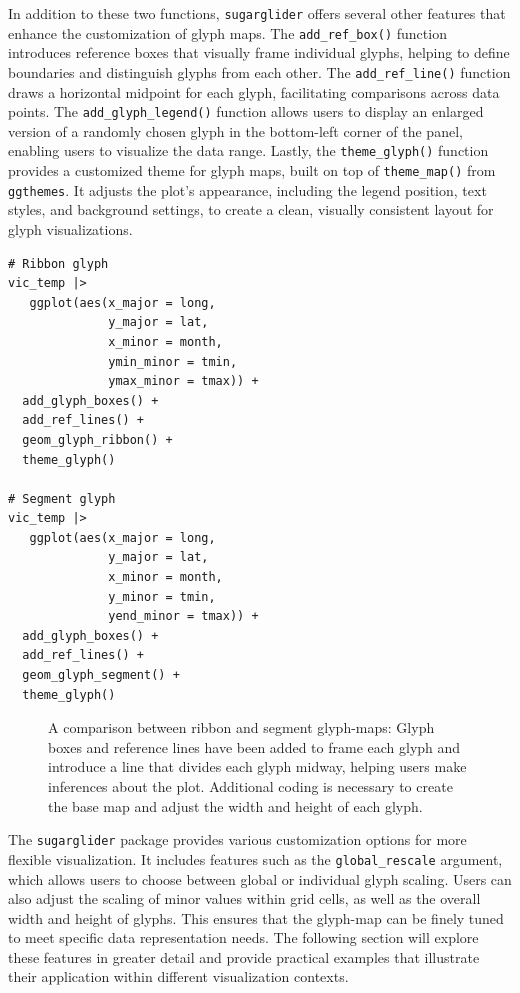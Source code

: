 In addition to these two functions, \texttt{sugarglider} offers several other features that enhance the customization of glyph maps. The \texttt{add\_ref\_box()} function introduces reference boxes that visually frame individual glyphs, helping to define boundaries and distinguish glyphs from each other. The \texttt{add\_ref\_line()} function draws a horizontal midpoint for each glyph, facilitating comparisons across data points. The \texttt{add\_glyph\_legend()} function allows users to display an enlarged version of a randomly chosen glyph in the bottom-left corner of the panel, enabling users to visualize the data range. Lastly, the \texttt{theme\_glyph()} function provides a customized theme for glyph maps, built on top of \texttt{theme\_map()} from \texttt{ggthemes}. It adjusts the plot's appearance, including the legend position, text styles, and background settings, to create a clean, visually consistent layout for glyph visualizations.

\begin{verbatim}
# Ribbon glyph
vic_temp |>
   ggplot(aes(x_major = long,
              y_major = lat,
              x_minor = month,
              ymin_minor = tmin,
              ymax_minor = tmax)) +
  add_glyph_boxes() +
  add_ref_lines() +
  geom_glyph_ribbon() +
  theme_glyph()

# Segment glyph
vic_temp |>
   ggplot(aes(x_major = long,
              y_major = lat,
              x_minor = month,
              y_minor = tmin,
              yend_minor = tmax)) +
  add_glyph_boxes() +
  add_ref_lines() +
  geom_glyph_segment() +
  theme_glyph()
\end{verbatim}

\begin{figure}
\centering
{}
\caption{\label{fig:comparisonPlot}A comparison between ribbon and segment glyph-maps: Glyph boxes and reference lines have been added to frame each glyph and introduce a line that divides each glyph midway, helping users make inferences about the plot. Additional coding is necessary to create the base map and adjust the width and height of each glyph.}
\end{figure}

The \texttt{sugarglider} package provides various customization options for more flexible visualization. It includes features such as the \texttt{global\_rescale} argument, which allows users to choose between global or individual glyph scaling. Users can also adjust the scaling of minor values within grid cells, as well as the overall width and height of glyphs. This ensures that the glyph-map can be finely tuned to meet specific data representation needs. The following section will explore these features in greater detail and provide practical examples that illustrate their application within different visualization contexts.

